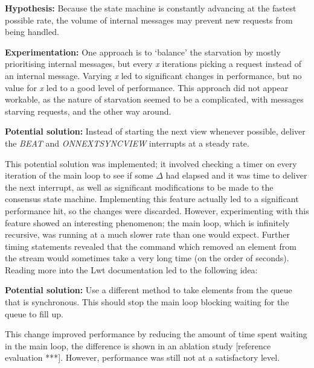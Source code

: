 \textbf{Hypothesis: } Because the state machine is constantly advancing at the fastest possible rate, the volume of internal messages may prevent new requests from being handled.

\textbf{Experimentation: } One approach is to `balance' the starvation by mostly prioritising internal messages, but every \textit{x} iterations picking a request instead of an internal message. Varying \textit{x} led to significant changes in performance, but no value for \textit{x} led to a good level of performance. This approach did not appear workable, as the nature of starvation seemed to be a complicated, with messages starving requests, and the other way around.

\textbf{Potential solution: } Instead of starting the next view whenever possible, deliver the \textit{BEAT} and \textit{ON{\large N}EXT{\large S}YNC{\large V}IEW} interrupts at a steady rate.

This potential solution was implemented; it involved checking a timer on every iteration of the main loop to see if some $\Delta$ had elapsed and it was time to deliver the next interrupt, as well as significant modifications to be made to the consensus state machine. Implementing this feature actually led to a significant performance hit, so the changes were discarded. However, experimenting with this feature showed an interesting phenomenon; the main loop, which is infinitely recursive, was running at a much slower rate than one would expect. Further timing statements revealed that the command which removed an element from the stream would sometimes take a very long time (on the order of seconds). Reading more into the Lwt documentation led to the following idea:

\textbf{Potential solution: } Use a different method to take elements from the queue that is synchronous. This should stop the main loop blocking waiting for the queue to fill up.

This change improved performance by reducing the amount of time spent waiting in the main loop, the difference is shown in an ablation study [reference evaluation ***]. However, performance was still not at a satisfactory level.

